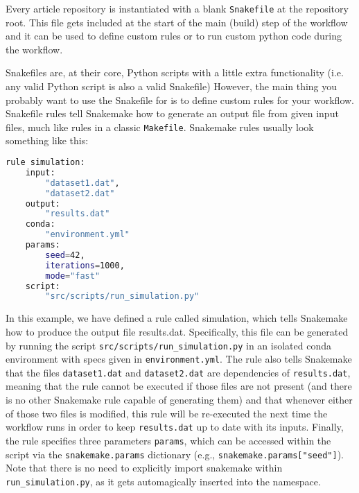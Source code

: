 \documentclass{aa}
\begin{document}
Every \showyourwork article repository is instantiated with a blank \texttt{Snakefile} at the repository root.
This file gets included at the start of the main (build) step of the workflow and it can be used to define custom rules or to run custom python code during the workflow.

Snakefiles are, at their core, Python scripts with a little extra functionality (i.e. any valid Python script is also a valid Snakefile)
However, the main thing you probably want to use the Snakefile for is to define custom rules for your workflow.
Snakefile rules tell Snakemake how to generate an output file from given input files, much like rules in a classic \texttt{Makefile}.
Snakemake rules usually look something like this:

\begin{lstlisting}[language=bash, caption=Snakemake]
rule simulation:
    input:
        "dataset1.dat",
        "dataset2.dat"
    output:
        "results.dat"
    conda:
        "environment.yml"
    params:
        seed=42,
        iterations=1000,
        mode="fast"
    script:
        "src/scripts/run_simulation.py"
\end{lstlisting}
In this example, we have defined a rule called simulation, which tells Snakemake how to produce the output file results.dat.
Specifically, this file can be generated by running the script \texttt{src/scripts/run\_simulation.py} in an isolated conda environment with specs given in \texttt{environment.yml}.
The rule also tells Snakemake that the files \texttt{dataset1.dat} and \texttt{dataset2.dat} are dependencies of \texttt{results.dat}, meaning that the rule cannot be executed if those files are not present (and there is no other Snakemake rule capable of generating them) and that whenever either of those two files is modified, this rule will be re-executed the next time the workflow runs in order to keep \texttt{results.dat} up to date with its inputs.
Finally, the rule specifies three parameters \texttt{params}, which can be accessed within the script via the \texttt{snakemake.params} dictionary (e.g., \texttt{snakemake.params["seed"]}). Note that there is no need to explicitly import snakemake within \texttt{run\_simulation.py}, as it gets automagically inserted into the namespace.
\end{document}

